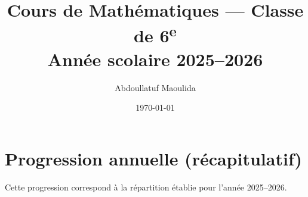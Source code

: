\documentclass[12pt,a4paper]{book}
\title{Cours de Mathématiques — Classe de 6\textsuperscript{e}\\[0.4em]\large Année scolaire 2025–2026}
\author{Abdoullatuf Maoulida}
\date{\today}
\begin{document}
\maketitle
\tableofcontents
\cleardoublepage
















\appendix
\chapter{Progression annuelle (récapitulatif)}
Cette progression correspond à la répartition établie pour l'année 2025–2026.
\end{document}

